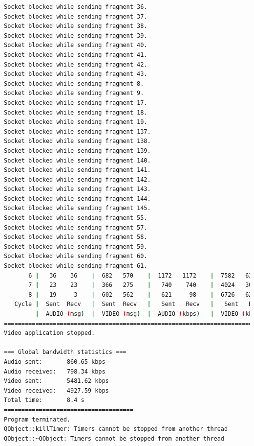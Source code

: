 \begin{lstlisting}[language=bash,basicstyle=\ttfamily\tiny]
Socket blocked while sending fragment 36.
Socket blocked while sending fragment 37.
Socket blocked while sending fragment 38.
Socket blocked while sending fragment 39.
Socket blocked while sending fragment 40.
Socket blocked while sending fragment 41.
Socket blocked while sending fragment 42.
Socket blocked while sending fragment 43.
Socket blocked while sending fragment 8.
Socket blocked while sending fragment 9.
Socket blocked while sending fragment 17.
Socket blocked while sending fragment 18.
Socket blocked while sending fragment 19.
Socket blocked while sending fragment 137.
Socket blocked while sending fragment 138.
Socket blocked while sending fragment 139.
Socket blocked while sending fragment 140.
Socket blocked while sending fragment 141.
Socket blocked while sending fragment 142.
Socket blocked while sending fragment 143.
Socket blocked while sending fragment 144.
Socket blocked while sending fragment 145.
Socket blocked while sending fragment 55.
Socket blocked while sending fragment 57.
Socket blocked while sending fragment 58.
Socket blocked while sending fragment 59.
Socket blocked while sending fragment 60.
Socket blocked while sending fragment 61.
       6 |   36    36    |  682   570    |  1172   1172    |  7582   6338    |  33     70       
       7 |   23    23    |  366   275    |   740    740    |  4024   3025    |  33     50       
       8 |   19     3    |  602   562    |   621     98    |  6726   6280    |  13     72       
   Cycle |  Sent  Recv   |  Sent  Recv   |   Sent   Recv   |   Sent   Recv   | Program System
         |  AUDIO (msg)  |  VIDEO (msg)  |  AUDIO (kbps)   |  VIDEO (kbps)   |     CPU (%) 
===========================================================================================
Video application stopped.

=== Global bandwidth statistics ===
Audio sent:       860.65 kbps
Audio received:   798.34 kbps
Video sent:       5481.62 kbps
Video received:   4927.59 kbps
Total time:       8.4 s
=====================================
Program terminated.
QObject::killTimer: Timers cannot be stopped from another thread
QObject::~QObject: Timers cannot be stopped from another thread
\end{lstlisting}
\vspace{\baselineskip}

